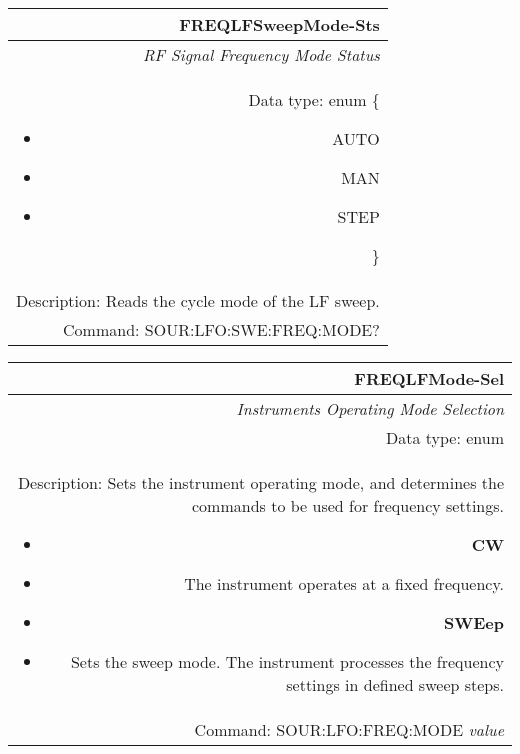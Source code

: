 \documentclass[openany]{article}
\begin{document}
		\begin{tabular}{N}
			\hline
			\bfseries FREQLFSweepMode-Sts \\ \hline
			\emph{RF Signal Frequency Mode Status} \\
			Data type: enum \{\begin{itemize}[noitemsep]
				\small
				\item[] AUTO
				\item[] MAN
				\item[] STEP
			\end{itemize}\} \\ 
			Description: Reads the cycle mode of the LF sweep. \\
			Command: SOUR:LFO:SWE:FREQ:MODE? \\

		\end{tabular}
%
		\begin{tabular}{N}
			\hline
			\bfseries FREQLFMode-Sel \\ \hline
			\emph{Instruments Operating Mode Selection} \\
			Data type: enum \\
			Description: Sets the instrument operating mode, and determines the commands to be used for frequency settings.\begin{itemize}[noitemsep]
				\small
				\item[] \textbf{CW} 
				\item[] The instrument operates at a fixed frequency.
				\item[] \textbf{SWEep}
				\item[] Sets the sweep mode. The instrument processes the frequency settings in defined sweep steps.
			\end{itemize} \\
			Command: SOUR:LFO:FREQ:MODE \emph{value} \\

		\end{tabular}
\end{document}
